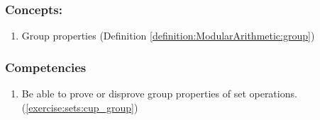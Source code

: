 \subsubsection*{Concepts:}
\begin{enumerate}
\item 
Group properties   (Definition \ref{definition:ModularArithmetic:group})
\end{enumerate}

\subsubsection*{Competencies}
\begin{enumerate}
\item
Be able to prove or disprove group properties of set operations. (\ref{exercise:sets:cup_group}) 
\end{enumerate}
